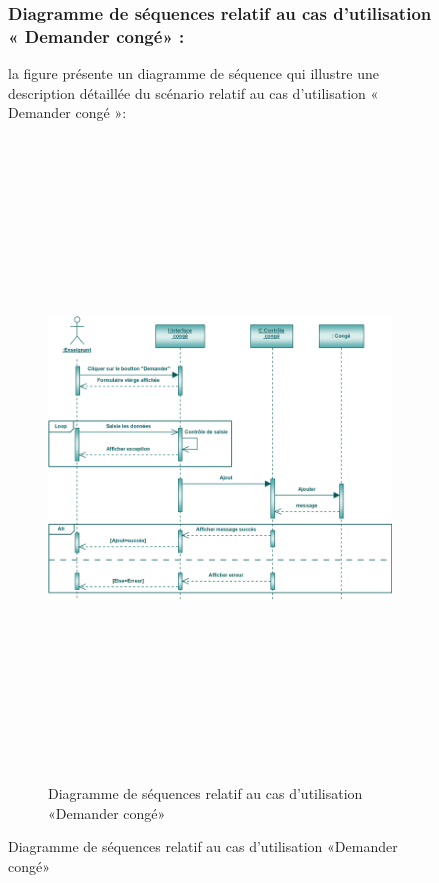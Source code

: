 \documentclass[12 pt]{report}
\begin{document}
\begin{figure}[h]
\begin{center}
\subsubsection{Diagramme de séquences relatif au cas d’utilisation « Demander congé» :}
la figure   présente un diagramme de séquence qui illustre une description détaillée du scénario relatif au cas d’utilisation « Demander congé »: 
\begin{figure}[h]
 \begin{center}
\includegraphics[width= 18 cm ,height=  17cm]{sdc.PNG}
\caption{Diagramme de séquences relatif au cas d’utilisation «Demander congé»}

\end{center}
\end{figure}

\end{center}
\end{figure}
\end{document}

